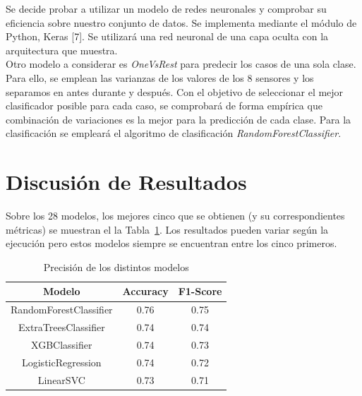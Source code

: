 \documentclass{esannV2}
\begin{document}
Se decide probar a utilizar un modelo de redes neuronales y comprobar su eficiencia sobre nuestro conjunto de datos. Se implementa mediante el módulo de Python, Keras [7]. Se utilizará una red neuronal de una capa oculta con la arquitectura que muestra. \\ 

Otro modelo a considerar es \textit{OneVsRest} para predecir los casos de una sola clase. Para ello, se emplean las varianzas de los valores de los 8 sensores y los separamos en antes durante y después. 
Con el objetivo de seleccionar el mejor clasificador posible para cada caso, se comprobará de forma empírica que combinación de variaciones es la mejor para la predicción de cada clase. Para la clasificación se empleará el algoritmo de clasificación \textit{RandomForestClassifier}. \\



\section{Discusión de Resultados}
Sobre los 28 modelos, los mejores cinco que se obtienen (y su correspondientes métricas) se muestran el la Tabla~\ref{tab:lazypred}. Los resultados pueden variar según la ejecución pero estos modelos siempre se encuentran entre los cinco primeros.\\

\begin{table}[!]
  \centering
  \begin{tabular}{|c|c|c|}
    \hline
    Modelo & Accuracy & F1-Score \\
    \hline
    RandomForestClassifier & 0.76 & 0.75 \\ 
	ExtraTreesClassifier & 0.74 & 0.74 \\ 
	XGBClassifier & 0.74 & 0.73 \\ 
	LogisticRegression & 0.74 & 0.72 \\ 
	LinearSVC & 0.73 & 0.71 \\ 
    \hline
  \end{tabular}
  \caption{Precisión de los distintos modelos}\label{tab:lazypred}
\end{table}

\end{document}
